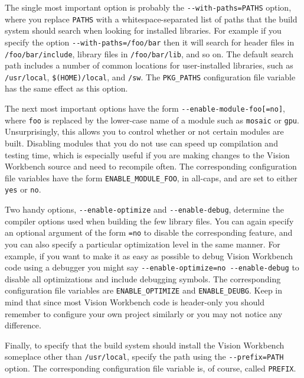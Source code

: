 The single most important option is probably the \verb#--with-paths=PATHS# 
option, where you replace \verb#PATHS# with a whitespace-separated list of 
paths that the build system should search when looking for installed 
libraries.  For example if you specify the option \verb#--with-paths=/foo/bar# 
then it will search for header files in \verb#/foo/bar/include#, library 
files in \verb#/foo/bar/lib#, and so on.  The default search path includes 
a number of common locations for user-installed libraries, such as 
\verb#/usr/local#, \verb#$(HOME)/local#, and \verb#/sw#.  The \verb#PKG_PATHS# 
configuration file variable has the same effect as this option.

The next most important options have the form \verb#--enable-module-foo[=no]#, 
where \verb#foo# is replaced by the lower-case name of a module such
as \verb#mosaic# or \verb#gpu#.  Unsurprisingly, this allows you to
control whether or not certain modules are built.  Disabling modules
that you do not use can speed up compilation and testing time, which
is especially useful if you are making changes to the Vision Workbench
source and need to recompile often.  The corresponding configuration
file variables have the form \verb#ENABLE_MODULE_FOO#, in all-caps,
and are set to either \verb#yes# or \verb#no#.

Two handy options, \verb#--enable-optimize# and \verb#--enable-debug#,
determine the compiler options used when building the few library
files.  You can again specify an optional argument of the form
\verb#=no# to disable the corresponding feature, and you can also
specify a particular optimization level in the same manner.  For
example, if you want to make it as easy as possible to debug Vision 
Workbench code using a debugger you might say 
\verb#--enable-optimize=no --enable-debug# 
to disable all optimizations and include debugging symbols.  The corresponding
configuration file variables are \verb#ENABLE_OPTIMIZE# and
\verb#ENABLE_DEUBG#.  Keep in mind that since most Vision Workbench
code is header-only you should remember to configure your own project
similarly or you may not notice any difference.

Finally, to specify that the build system should install the Vision Workbench 
someplace other than \verb#/usr/local#, specify the path using the 
\verb#--prefix=PATH# option.   The corresponding configuration file 
variable is, of course, called \verb#PREFIX#.
